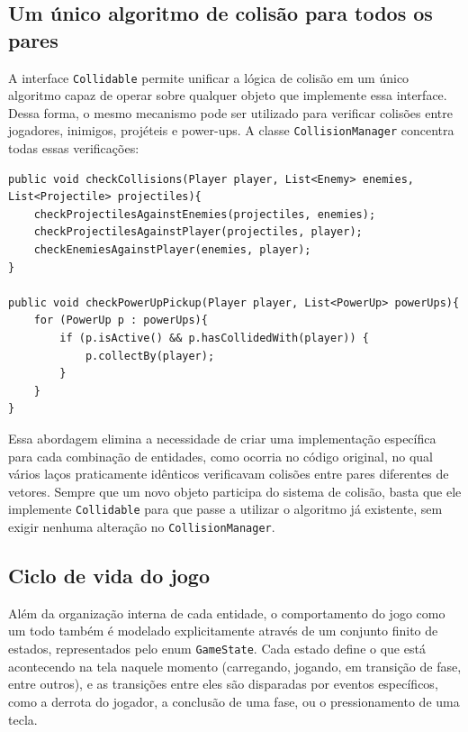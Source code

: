 \subsection{Um único algoritmo de colisão para todos os pares}

A interface \texttt{Collidable} permite unificar a lógica de colisão em um
único algoritmo capaz de operar sobre qualquer objeto que implemente essa
interface. Dessa forma, o mesmo mecanismo pode ser utilizado para verificar
colisões entre jogadores, inimigos, projéteis e power-ups. A classe
\texttt{CollisionManager} concentra todas essas verificações:

\begin{lstlisting}[caption={Alguns métodos de \texttt{CollisionManager} operando sobre listas de classes \texttt{Collidable} (CollisionManager.java)}]
public void checkCollisions(Player player, List<Enemy> enemies, List<Projectile> projectiles){
    checkProjectilesAgainstEnemies(projectiles, enemies);
    checkProjectilesAgainstPlayer(projectiles, player);
    checkEnemiesAgainstPlayer(enemies, player);
}

public void checkPowerUpPickup(Player player, List<PowerUp> powerUps){
    for (PowerUp p : powerUps){
        if (p.isActive() && p.hasCollidedWith(player)) {
            p.collectBy(player);
        }
    }
}
\end{lstlisting}

Essa abordagem elimina a necessidade de criar uma implementação específica para
cada combinação de entidades, como ocorria no código original, no qual vários
laços praticamente idênticos verificavam colisões entre pares diferentes de
vetores. Sempre que um novo objeto participa do
sistema de colisão, basta que ele implemente \texttt{Collidable} para que passe
a utilizar o algoritmo já existente, sem exigir nenhuma alteração no
\texttt{CollisionManager}.

\subsection{Ciclo de vida do jogo}

Além da organização interna de cada entidade, o comportamento do jogo como um
todo também é modelado explicitamente através de um conjunto finito de
estados, representados pelo enum \texttt{GameState}. Cada estado define o que
está acontecendo na tela naquele momento (carregando, jogando, em transição
de fase, entre outros), e as transições entre eles são disparadas por eventos
específicos, como a derrota do jogador, a conclusão de uma fase, ou o
pressionamento de uma tecla.

